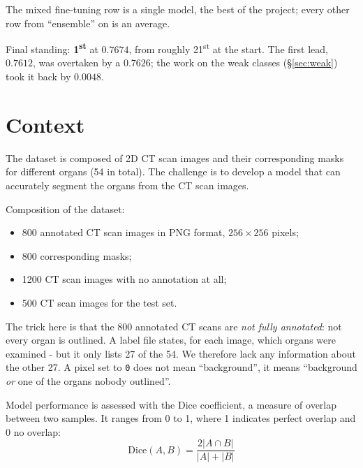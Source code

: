 \documentclass{article}
\let\frac\dfrac
\begin{document}
\vspace{2.0mm}

\noindent The mixed fine-tuning row is a single model, the best of the project;
every other row from ``ensemble'' on is an average.

\vspace{2.0mm}

\noindent Final standing: \textbf{1\textsuperscript{st}} at $0.7674$, from roughly
21\textsuperscript{st} at the start. The first lead, $0.7612$, was overtaken by a
$0.7626$; the work on the weak classes (\S\ref{sec:weak}) took it back by $0.0048$.


\newpage

\section{Context}

The dataset is composed of 2D CT scan images and their corresponding masks for
different organs (54 in total). The challenge is to develop a model that can
accurately segment the organs from the CT scan images.

\vspace{2.0mm}

Composition of the dataset:
\begin{itemize}
    \item 800 annotated CT scan images in PNG format, $256\times256$ pixels;
    \item 800 corresponding masks;
    \item 1200 CT scan images with no annotation at all;
    \item 500 CT scan images for the test set.
\end{itemize}

\vspace{2.0mm}

\noindent The trick here is that the 800 annotated CT scans are \emph{not fully
annotated}: not every organ is outlined. A label file states, for each image,
which organs were examined - but it only lists 27 of the 54. We therefore lack
any information about the other 27. A pixel set to \texttt{0} does not mean
``background'', it means ``background \emph{or} one of the organs nobody
outlined''.

\vspace{2.0mm}

\noindent Model performance is assessed with the Dice coefficient, a measure of overlap
between two samples. It ranges from 0 to 1, where 1 indicates perfect overlap
and 0 no overlap:
\begin{equation}
    \text{Dice}(A, B) = \frac{2 |A \cap B|}{|A| + |B|}
\end{equation}
\end{document}
